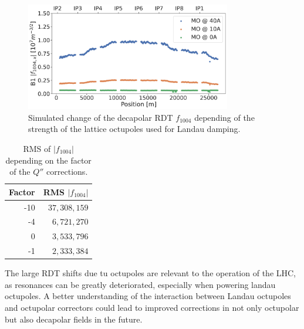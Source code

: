 \begin{figure}[!htb]
    \centering
    \includegraphics[width=0.8\textwidth]{./images/f1004/f1004_mo.pdf}
    \caption{Simulated change of the decapolar RDT $f_{1004}$ depending of the strength of the
    lattice octupoles used for Landau damping.}
    \label{fig:decapoles:rdts:simulation_mo_powered}
\end{figure}


\begin{table}[!htb]
    \centering
    \begin{tabular}{rr}
    \toprule
    Factor & RMS $|f_{1004}|$ \\
    \midrule
       -10 & $37,308,159$         \\ 
        -4 &  $6,721,270$          \\ 
         0 &  $3,533,796$          \\ 
        -1 &  $2,333,384$          \\
    \bottomrule
    \end{tabular}
    \caption{RMS of $|f_{1004}|$ depending on the factor of the $Q''$ corrections.}
    \label{table:decapoles:corrections_dq2_f1004_rms}
\end{table}

The large RDT shifts due tu octupoles are relevant to the operation of the LHC, as
resonances can be greatly deteriorated, especially when powering landau octupoles.
A better understanding of the interaction between Landau octupoles and octupolar correctors could
lead to improved corrections in not only octupolar but also decapolar fields in the future.



\subsubsection{}

